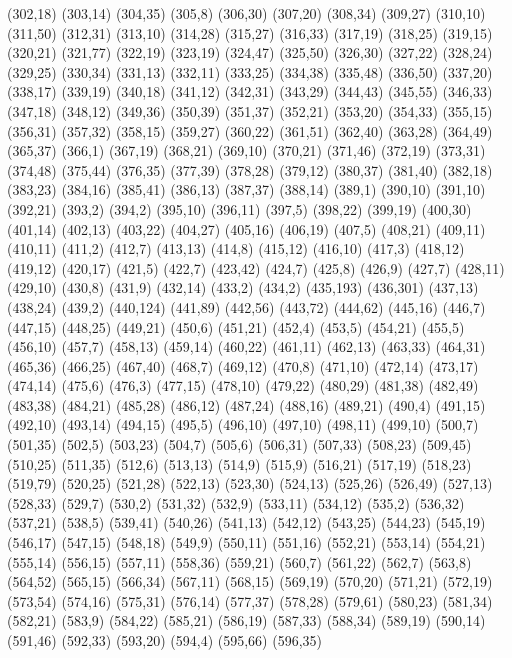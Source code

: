 {(302,18)
(303,14)
(304,35)
(305,8)
(306,30)
(307,20)
(308,34)
(309,27)
(310,10)
(311,50)
(312,31)
(313,10)
(314,28)
(315,27)
(316,33)
(317,19)
(318,25)
(319,15)
(320,21)
(321,77)
(322,19)
(323,19)
(324,47)
(325,50)
(326,30)
(327,22)
(328,24)
(329,25)
(330,34)
(331,13)
(332,11)
(333,25)
(334,38)
(335,48)
(336,50)
(337,20)
(338,17)
(339,19)
(340,18)
(341,12)
(342,31)
(343,29)
(344,43)
(345,55)
(346,33)
(347,18)
(348,12)
(349,36)
(350,39)
(351,37)
(352,21)
(353,20)
(354,33)
(355,15)
(356,31)
(357,32)
(358,15)
(359,27)
(360,22)
(361,51)
(362,40)
(363,28)
(364,49)
(365,37)
(366,1)
(367,19)
(368,21)
(369,10)
(370,21)
(371,46)
(372,19)
(373,31)
(374,48)
(375,44)
(376,35)
(377,39)
(378,28)
(379,12)
(380,37)
(381,40)
(382,18)
(383,23)
(384,16)
(385,41)
(386,13)
(387,37)
(388,14)
(389,1)
(390,10)
(391,10)
(392,21)
(393,2)
(394,2)
(395,10)
(396,11)
(397,5)
(398,22)
(399,19)
(400,30)
(401,14)
(402,13)
(403,22)
(404,27)
(405,16)
(406,19)
(407,5)
(408,21)
(409,11)
(410,11)
(411,2)
(412,7)
(413,13)
(414,8)
(415,12)
(416,10)
(417,3)
(418,12)
(419,12)
(420,17)
(421,5)
(422,7)
(423,42)
(424,7)
(425,8)
(426,9)
(427,7)
(428,11)
(429,10)
(430,8)
(431,9)
(432,14)
(433,2)
(434,2)
(435,193)
(436,301)
(437,13)
(438,24)
(439,2)
(440,124)
(441,89)
(442,56)
(443,72)
(444,62)
(445,16)
(446,7)
(447,15)
(448,25)
(449,21)
(450,6)
(451,21)
(452,4)
(453,5)
(454,21)
(455,5)
(456,10)
(457,7)
(458,13)
(459,14)
(460,22)
(461,11)
(462,13)
(463,33)
(464,31)
(465,36)
(466,25)
(467,40)
(468,7)
(469,12)
(470,8)
(471,10)
(472,14)
(473,17)
(474,14)
(475,6)
(476,3)
(477,15)
(478,10)
(479,22)
(480,29)
(481,38)
(482,49)
(483,38)
(484,21)
(485,28)
(486,12)
(487,24)
(488,16)
(489,21)
(490,4)
(491,15)
(492,10)
(493,14)
(494,15)
(495,5)
(496,10)
(497,10)
(498,11)
(499,10)
(500,7)
(501,35)
(502,5)
(503,23)
(504,7)
(505,6)
(506,31)
(507,33)
(508,23)
(509,45)
(510,25)
(511,35)
(512,6)
(513,13)
(514,9)
(515,9)
(516,21)
(517,19)
(518,23)
(519,79)
(520,25)
(521,28)
(522,13)
(523,30)
(524,13)
(525,26)
(526,49)
(527,13)
(528,33)
(529,7)
(530,2)
(531,32)
(532,9)
(533,11)
(534,12)
(535,2)
(536,32)
(537,21)
(538,5)
(539,41)
(540,26)
(541,13)
(542,12)
(543,25)
(544,23)
(545,19)
(546,17)
(547,15)
(548,18)
(549,9)
(550,11)
(551,16)
(552,21)
(553,14)
(554,21)
(555,14)
(556,15)
(557,11)
(558,36)
(559,21)
(560,7)
(561,22)
(562,7)
(563,8)
(564,52)
(565,15)
(566,34)
(567,11)
(568,15)
(569,19)
(570,20)
(571,21)
(572,19)
(573,54)
(574,16)
(575,31)
(576,14)
(577,37)
(578,28)
(579,61)
(580,23)
(581,34)
(582,21)
(583,9)
(584,22)
(585,21)
(586,19)
(587,33)
(588,34)
(589,19)
(590,14)
(591,46)
(592,33)
(593,20)
(594,4)
(595,66)
(596,35)
}
